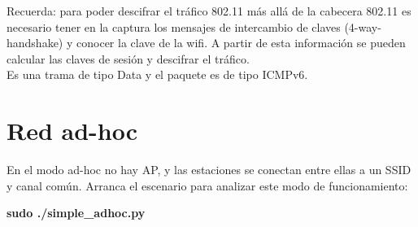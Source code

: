 \documentclass[12pt, a4paper]{report}
\begin{document}
\begin{enumerate}
	Recuerda: para poder descifrar el tráfico 802.11 más allá de la cabecera 802.11 es necesario tener
	en la captura los mensajes de intercambio de claves (4-way-handshake) y conocer la clave de la
	wifi. A partir de esta información se pueden calcular las claves de sesión y descifrar el tráfico.\\
		
	Es una trama de tipo Data y el paquete es de tipo ICMPv6.
\end{enumerate}
\chapter{Red ad-hoc}
En el modo ad-hoc no hay AP, y las estaciones se conectan entre ellas a un SSID y canal común.
Arranca el escenario para analizar este modo de funcionamiento:
\begin{center}
	\textbf{sudo ./simple\_adhoc.py}
\end{center}
\end{document}
